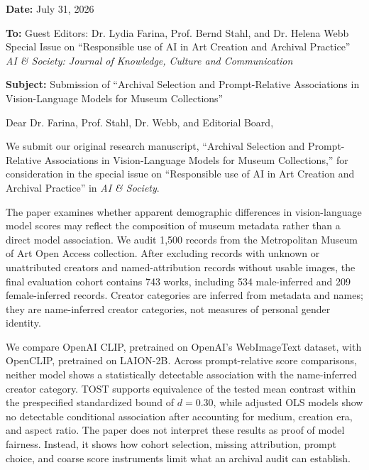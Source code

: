 \documentclass[11pt]{article}
\begin{document}
\begin{flushright}
\textbf{Date:} July 31, 2026
\end{flushright}

\textbf{To:} Guest Editors: Dr. Lydia Farina, Prof. Bernd Stahl, and Dr. Helena Webb\\
Special Issue on ``Responsible use of AI in Art Creation and Archival Practice''\\
\textit{AI \& Society: Journal of Knowledge, Culture and Communication}

\vspace{1em}

\noindent\textbf{Subject:} Submission of ``Archival Selection and Prompt-Relative Associations in Vision-Language Models for Museum Collections''

\vspace{1em}

Dear Dr. Farina, Prof. Stahl, Dr. Webb, and Editorial Board,

We submit our original research manuscript, ``Archival Selection and Prompt-Relative Associations in Vision-Language Models for Museum Collections,'' for consideration in the special issue on ``Responsible use of AI in Art Creation and Archival Practice'' in \textit{AI \& Society}.

The paper examines whether apparent demographic differences in vision-language model scores may reflect the composition of museum metadata rather than a direct model association. We audit 1,500 records from the Metropolitan Museum of Art Open Access collection. After excluding records with unknown or unattributed creators and named-attribution records without usable images, the final evaluation cohort contains 743 works, including 534 male-inferred and 209 female-inferred records. Creator categories are inferred from metadata and names; they are name-inferred creator categories, not measures of personal gender identity.

We compare OpenAI CLIP, pretrained on OpenAI's WebImageText dataset, with OpenCLIP, pretrained on LAION-2B. Across prompt-relative score comparisons, neither model shows a statistically detectable association with the name-inferred creator category. TOST supports equivalence of the tested mean contrast within the prespecified standardized bound of $d=0.30$, while adjusted OLS models show no detectable conditional association after accounting for medium, creation era, and aspect ratio. The paper does not interpret these results as proof of model fairness. Instead, it shows how cohort selection, missing attribution, prompt choice, and coarse score instruments limit what an archival audit can establish.
\end{document}
